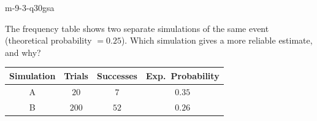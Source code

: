 \begin{practiceQuestion}{m-9-3-q30}{gsa}
\begin{questionText}
The frequency table shows two separate simulations of the same event (theoretical probability $= 0.25$). Which simulation gives a more reliable estimate, and why?

\begin{center}
\begin{tabular}{|c|c|c|c|}
\hline
\textbf{Simulation} & \textbf{Trials} & \textbf{Successes} & \textbf{Exp.\ Probability} \\
\hline
A & $20$ & $7$ & $0.35$ \\
\hline
B & $200$ & $52$ & $0.26$ \\
\hline
\end{tabular}
\end{center}
\end{questionText}
\end{practiceQuestion}
